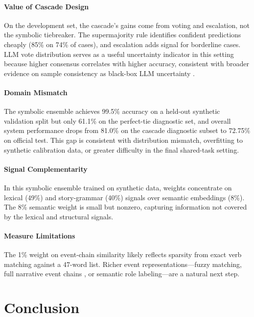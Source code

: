 \documentclass[11pt]{article}
\begin{document}
\paragraph{Value of Cascade Design}
On the development set, the cascade's gains come from voting and escalation, not the symbolic tiebreaker. The supermajority rule identifies confident predictions cheaply (85\% on 74\% of cases), and escalation adds signal for borderline cases. LLM vote distribution serves as a useful uncertainty indicator in this setting because higher consensus correlates with higher accuracy, consistent with broader evidence on sample consistency as black-box LLM uncertainty \citep{xiong2024uncertainty}.

\paragraph{Domain Mismatch}
The symbolic ensemble achieves 99.5\% accuracy on a held-out synthetic validation split but only 61.1\% on the perfect-tie diagnostic set, and overall system performance drops from 81.0\% on the cascade diagnostic subset to 72.75\% on official test. This gap is consistent with distribution mismatch, overfitting to synthetic calibration data, or greater difficulty in the final shared-task setting.

\paragraph{Signal Complementarity}
In this symbolic ensemble trained on synthetic data, weights concentrate on lexical (49\%) and story-grammar (40\%) signals over semantic embeddings (8\%). The 8\% semantic weight is small but nonzero, capturing information not covered by the lexical and structural signals.

\paragraph{Measure Limitations}
The 1\% weight on event-chain similarity likely reflects sparsity from exact verb matching against a 47-word list. Richer event representations---fuzzy matching, full narrative event chains \citep{chambers2008narrativechains}, or semantic role labeling---are a natural next step.

\section{Conclusion}
\end{document}
